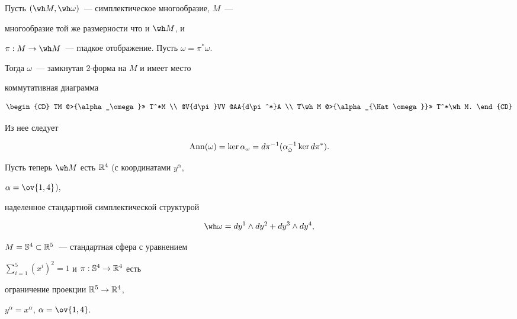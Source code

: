 \begin{examnonum}


Пусть $(\wh M,\wh\omega)$~--- симплектическое многообразие, $M$~---


многообразие той же размерности что и $\wh M$, и


$\pi: M \to \wh M$~--- гладкое отображение. Пусть $\omega =


\pi^*\omega$.


Тогда $\omega$~--- замкнутая 2-форма на $M$ и имеет место


коммутативная диаграмма


$$


\begin{CD}


TM @>{\alpha_\omega}>> T^*M


\\


@V{d\pi}VV @AA{d\pi^*}A


\\


T\wh M @>{\alpha_{\Hat \omega}}>> T^*\wh M.


\end{CD}


$$


Из нее следует


\begin{equation}


\label{eq16}


\Ann(\omega) = \ker\alpha_\omega =


d\pi^{-1}(\alpha^{-1}_{\Hat\omega}\ker d\pi^*).


\end{equation}





Пусть теперь $\wh M$ есть ${\Bbb R}^4$ (с координатами $y^\alpha$,


$\alpha=\ov{1,4}$),


наделенное стандартной симплектической структурой


$$


\wh\omega = dy^1\wedge dy^2 + dy^3 \wedge dy^4,


$$


$M = {\Bbb S}^4 \subset {\Bbb R}^5$~--- стандартная сфера с уравнением


$\sum\limits_{i=1}^5 (x^i)^2 = 1$ и $\pi : {\Bbb S}^4 \to {\Bbb R}^4$ есть


ограничение проекции ${\Bbb R}^5 \to {\Bbb R}^4$,


$y^\alpha = x^\alpha$, $\alpha=\ov{1,4}$.






\end{examnonum}
